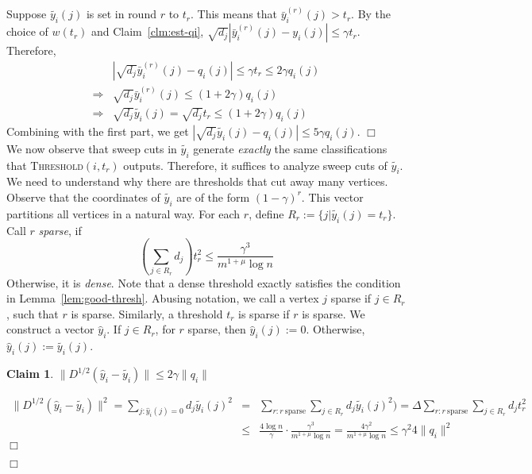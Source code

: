 \documentclass[11pt]{article}
\newtheorem{claim}[theorem]{Claim}
\newenvironment{myproof}{\noindent {\sc Proof:}}{$\Box$}
\newcommand\qi{q_i}
\newcommand\qhi{\widehat{y}_i}
\newcommand\qbi{\bar{y}_i}
\newcommand\qti{\widetilde{y_i}}
\newcommand\halfqi{y_i}
\newcommand\dense{\qhi}
\newcommand\Threshold{\textsc{Threshold}\xspace}
\def\Dhalf{D^{1/2}}
\begin{document}
\begin{myproof}
\begin{myproof}
Suppose $\qti(j)$ is set in round $r$ to $t_r$. This means
that $\qbi^{(r)}(j) > t_r$. By the choice of $w(t_r)$ and Claim~\ref{clm:est-qi},
$\sqrt{d_j}|\qbi^{(r)}(j) - \halfqi(j)| \leq \gamma t_r$.
Therefore,
\begin{eqnarray*}
	& |\sqrt{d_j} \qbi^{(r)}(j) - \qi(j)| \leq \gamma t_r \leq 2\gamma \qi(j) \\
	\Longrightarrow & \sqrt{d_j} \qbi^{(r)}(j) \leq (1+2\gamma) \qi(j) \\
	\Longrightarrow & \sqrt{d_j} \qti(j) = \sqrt{d_j} t_r \leq (1+2\gamma) \qi(j)
\end{eqnarray*}
Combining with the first part, we get $|\sqrt{d_j} \qti(j) - \qi(j)| \leq 5\gamma \qi(j)$.
\end{myproof}\\

We now observe that sweep cuts in $\qti$ generate \emph{exactly}
the same classifications that {\Threshold}$(i,t_r)$ outputs.
Therefore, it suffices to analyze sweep cuts of $\qti$.
We need to understand why there are thresholds that cut away many vertices.
Observe that the coordinates of $\qti$ are of the form $(1-\gamma)^r$.
This vector partitions all vertices in a natural way.
For each $r$, define $R_r := \{ j | \qti(j) = t_r\}$.
Call $r$ \emph{sparse}, if
$$(\sum_{j \in R_r} d_j) t_r^2 \leq \frac{\gamma^3}{m^{1+\mu}\log n}$$
Otherwise, it is \emph{dense}.
Note that a dense threshold exactly satisfies the condition
in Lemma~\ref{lem:good-thresh}.
Abusing notation, we call a vertex $j$ sparse if $j \in R_r$, such
that $r$ is sparse. Similarly, a threshold $t_r$ is sparse if $r$
is sparse. We construct a vector $\dense$.
If $j \in R_r$, for $r$ sparse, then $\dense(j) := 0$.
Otherwise, $\dense(j) := \qti(j)$.

\begin{claim} \label{clm:dense} $\|\Dhalf(\dense - \qti)\| \leq 2\gamma \|\qi\|$
\end{claim}

\begin{myproof}
\begin{eqnarray*} \|\Dhalf(\dense - \qti)\|^2 = \sum_{j : \dense(j)=0} d_j \qti(j)^2
& = & \sum_{r : r \ \text{sparse}} \sum_{j \in R_r} d_j \qti(j)^2)
= \Delta\sum_{r : r \ \text{sparse}} \sum_{j \in R_r} d_j t_r^2 \\
& \leq & \frac{4\log n}{\gamma} \cdot \frac{\gamma^3}{m^{1+\mu}\log n}
= \frac{4\gamma^2}{m^{1+\mu}\log n}
\leq \gamma^2 4\|\qi\|^2
\end{eqnarray*}
\end{myproof}


\end{myproof}
\end{document}
